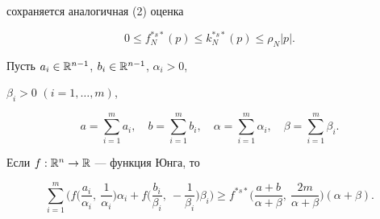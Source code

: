сохраняется аналогичная (2) оценка 


$$ 


0\le f^{*s*}_N(p)\le k^{*s*}_N(p)\le\rho_N|p|. 


$$ 


 


\begin{lem} 


Пусть $a_i\in\Bbb R^{n-1}$, $b_i\in\Bbb R^{n-1}$, $\alpha_i>0$, 


$\beta_i>0$ $(i=1,\dotsc,m)$, 


\begin{equation} 


a=\sum^m_{i=1}a_i,\quad b=\sum^m_{i=1}b_i,\quad 


\alpha=\sum^m_{i=1}\alpha_i,\quad \beta=\sum^m_{i=1}\beta_i. 


\end{equation} 


Если $f:\Bbb R^n\to\Bbb R$ --- функция Юнга, то 


\begin{equation} 


\sum^m_{i=1}\bigg(f\bigg(\frac{a_i}{\alpha_i},\ \frac{1}{\alpha_i} 


\bigg)\alpha_i+f\bigg(\frac{b_i}{\beta_i},\ -\frac{1}{\beta_i} 


\bigg)\beta_i\bigg)\ge f^{*s*}\bigg(\frac{a+b}{\alpha+\beta}, 


\ \frac{2m}{\alpha+\beta}\bigg)(\alpha+\beta). 


\end{equation} 


\end{lem} 


 


